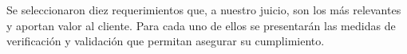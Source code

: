%
%
%
%
%

Se seleccionaron diez requerimientos que, a nuestro juicio, son los más relevantes y aportan valor al cliente. Para cada uno de ellos se presentarán las medidas de verificación y validación que permitan asegurar su cumplimiento.

